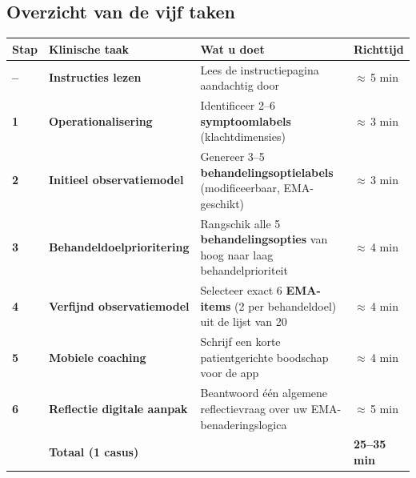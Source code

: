 \documentclass[11pt,a4paper]{article}
\renewcommand{\arraystretch}{1.28}
\begin{document}
\vspace{0.5em}

\subsection*{Overzicht van de vijf taken}

\begin{center}
\renewcommand{\arraystretch}{1.36}
\small
\begin{tabular}{@{}>{\bfseries\color{PrimaryBlue}}p{}>{\bfseries}p{}p{}p{}@{}}
\toprule
Stap & Klinische taak & Wat u doet & Richttijd \\
\midrule
-- & Instructies lezen & Lees de instructiepagina aandachtig door & $\approx$\,5 min \\
1 & Operationalisering & Identificeer 2--6 \textbf{symptoomlabels} (klachtdimensies) & $\approx$\,3 min \\
2 & Initieel observatiemodel & Genereer 3--5 \textbf{behandelingsoptielabels} (modificeerbaar, EMA-geschikt) & $\approx$\,3 min \\
3 & Behandeldoelprioritering & Rangschik alle 5 \textbf{behandelingsopties} van hoog naar laag behandelprioriteit & $\approx$\,4 min \\
4 & Verfijnd observatiemodel & Selecteer exact 6 \textbf{EMA-items} (2 per behandeldoel) uit de lijst van 20 & $\approx$\,4 min \\
5 & Mobiele coaching & Schrijf een korte patientgerichte boodschap voor de app & $\approx$\,4 min \\
6 & Reflectie digitale aanpak & Beantwoord één algemene reflectievraag over uw EMA-benaderingslogica & $\approx$\,5 min \\
\midrule
 & \textbf{Totaal (1 casus)} & & \textbf{25--35 min} \\
\bottomrule
\end{tabular}
\end{center}
\end{document}
